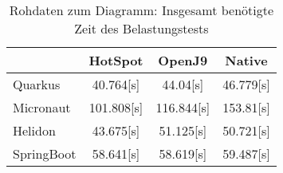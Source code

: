 \begin{table}[h]
    \centering
    \begin{tabular}{l|ccc}
        \hline
        & HotSpot & OpenJ9 & Native \\
        \hline
        Quarkus & 40.764[s] & 44.04[s] & 46.779[s] \\
        Micronaut & 101.808[s] & 116.844[s] & 153.81[s] \\
        Helidon & 43.675[s] & 51.125[s] & 50.721[s] \\
        SpringBoot & 58.641[s] & 58.619[s] & 59.487[s] \\
        \hline
    \end{tabular}
    \caption{Rohdaten zum Diagramm: Insgesamt benötigte Zeit des Belastungstests}
\end{table}
